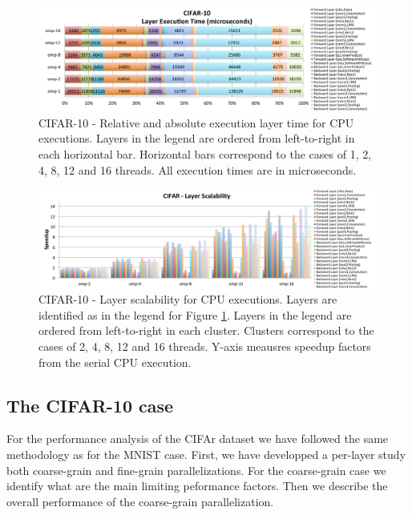 \begin{figure}[]
\includegraphics[width=\textwidth]{figures/cifar-abs-rel-time.pdf}
\caption{CIFAR-10 - Relative and absolute execution layer time for CPU executions. Layers in the legend are ordered from left-to-right in each horizontal bar. Horizontal bars correspond to the cases of 1, 2, 4, 8, 12 and 16 threads. All execution times are in microseconds.}
\label{fig-cifar-abs-rel}
\end{figure}

\begin{figure}[]
\includegraphics[width=\textwidth]{figures/cifar-scalability-layer.pdf}
\caption{CIFAR-10 - Layer scalability for CPU executions. Layers are identified as in the legend for Figure \ref{fig-cifar-abs-rel}. Layers in the legend are ordered from left-to-right in each cluster. Clusters correspond to the cases of 2, 4, 8, 12 and 16 threads. Y-axis meausres speedup factors from the serial CPU execution.}
\end{figure}

\subsection{The CIFAR-10 case}
For the performance analysis of the CIFAr dataset we have followed the 
same methodology as for the MNIST case. First, we have developped a 
per-layer study both coarse-grain and fine-grain parallelizations. 
For the coarse-grain case we identify what are the main limiting 
peformance factors. Then we describe the overall performance of the 
coarse-grain parallelization. 

